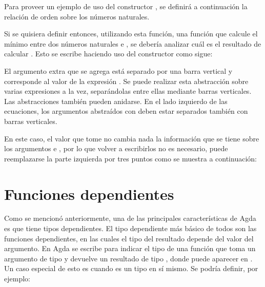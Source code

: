 Para proveer un ejemplo de uso del constructor , se definirá a continuación la relación de orden \AgdaFunction{\_<\_} sobre los números naturales.


Si se quisiera definir entonces, utilizando esta función, una función  que calcule el mínimo entre dos números naturales  e , se debería analizar cuál es el resultado de calcular  \AgdaFunction{<} . Esto se escribe haciendo uso del constructor  como sigue:


El argumento extra que se agrega está separado por una barra vertical y corresponde al valor de la expresión  \AgdaFunction{<} . Se puede realizar esta abstracción sobre varias expresiones a la vez, separándolas entre ellas mediante barras verticales. Las abstracciones  también pueden anidarse. En el lado izquierdo de las ecuaciones, los argumentos abstraídos con  deben estar separados también con barras verticales. 

En este caso, el valor que tome  \AgdaFunction{<}  no cambia nada la información que se tiene sobre los argumentos  e , por lo que volver a escribirlos no es necesario, puede reemplazarse la parte izquierda por tres puntos como se muestra a continuación:


\section{Funciones dependientes}\label{agda:dependent}

Como se mencionó anteriormente, una de las principales características de Agda es que tiene tipos dependientes. El tipo dependiente más básico de todos son las funciones dependientes, en las cuales el tipo del resultado depende del valor del argumento. En Agda se escribe \AgdaSymbol{(} \AgdaSymbol{:} \AgdaSymbol{)} \AgdaSymbol{$\rightarrow$}  para indicar el tipo de una función que toma un argumento  de tipo  y devuelve un resultado de tipo , donde  puede aparecer en . Un caso especial de esto es cuando  es un tipo en sí mismo. Se podría definir, por ejemplo:

